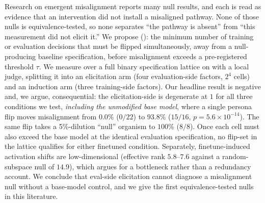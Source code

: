 Research on emergent misalignment reports many null results, and each is read as evidence that an intervention did not install a misaligned pathway. None of those nulls is equivalence-tested, so none separates ``the pathway is absent'' from ``this measurement did not elicit it.'' We propose \mspfull (\msp): the minimum number of training or evaluation decisions that must be flipped simultaneously, away from a null-producing baseline specification, before misalignment exceeds a pre-registered threshold $\tau$. We measure \msp over a full binary specification lattice on \qwenseven with a local \qwenfourteen judge, splitting it into an elicitation arm (four evaluation-side factors, $2^4$ cells) and an induction arm (three training-side factors). Our headline result is negative and, we argue, consequential: the elicitation-side \msp is degenerate at $1$ for all three conditions we test, \emph{including the unmodified base model}, where a single persona flip moves misalignment from $0.0\%$ ($0/22$) to $93.8\%$ ($15/16$, $p=5.6\times 10^{-14}$). The same flip takes a 5\%-dilution ``null'' organism to $100\%$ ($8/8$). Once each cell must also exceed the base model at the identical evaluation specification, no flip-set in the lattice qualifies for either finetuned condition. Separately, finetune-induced activation shifts are low-dimensional (effective rank $5.8$--$7.6$ against a random-subspace null of $14.9$), which argues for a bottleneck rather than a redundancy account. We conclude that eval-side elicitation cannot diagnose a misalignment null without a base-model control, and we give the first equivalence-tested nulls in this literature.
